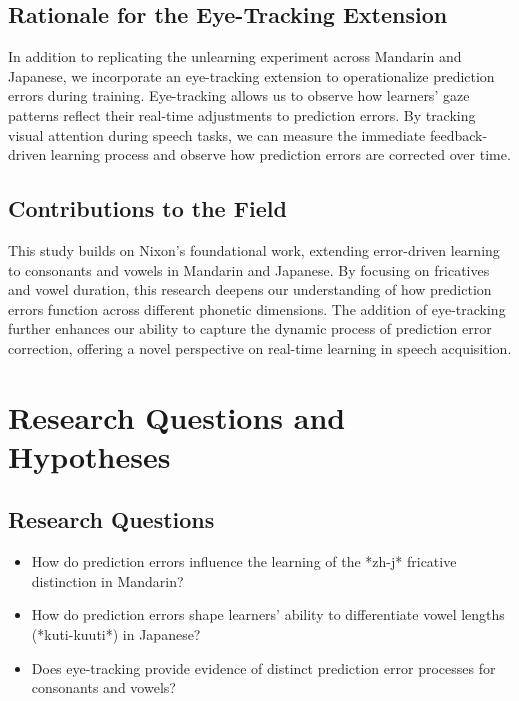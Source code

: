 \subsection{Rationale for the Eye-Tracking Extension}

In addition to replicating the unlearning experiment across Mandarin and Japanese, we incorporate an eye-tracking extension to operationalize prediction errors during training. Eye-tracking allows us to observe how learners' gaze patterns reflect their real-time adjustments to prediction errors. By tracking visual attention during speech tasks, we can measure the immediate feedback-driven learning process and observe how prediction errors are corrected over time.

\subsection{Contributions to the Field}

This study builds on Nixon's foundational work, extending error-driven learning to consonants and vowels in Mandarin and Japanese. By focusing on fricatives and vowel duration, this research deepens our understanding of how prediction errors function across different phonetic dimensions. The addition of eye-tracking further enhances our ability to capture the dynamic process of prediction error correction, offering a novel perspective on real-time learning in speech acquisition.

\section{Research Questions and Hypotheses}

\subsection{Research Questions}

\begin{itemize}
    \item How do prediction errors influence the learning of the *zh-j* fricative distinction in Mandarin?
    \item How do prediction errors shape learners' ability to differentiate vowel lengths (*kuti-kuuti*) in Japanese?
    \item Does eye-tracking provide evidence of distinct prediction error processes for consonants and vowels?
\end{itemize}

